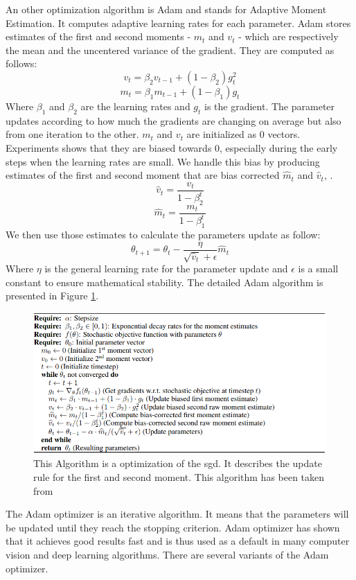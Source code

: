 An other optimization algorithm is Adam and stands for Adaptive Moment Estimation. It computes adaptive learning rates for each parameter. Adam stores estimates of the first and second moments - \(m_t\) and \(v_t\) - which are respectively the mean and the uncentered variance of the gradient. They are computed as follows: \[ v_t = \beta_2 v_{t-1} + (1 - \beta_2)g_t^2 \] \[m_t = \beta_1 m_{t-1} + (1 - \beta_1)g_t \]
Where \(\beta_1\) and \(\beta_2\) are the learning rates and \(g_t\) is the gradient. The parameter updates according to how much the gradients are changing on average but also from one iteration to the other.  \(m_t\) and \(v_t\) are initialized as 0 vectors. Experiments shows that they are biased towards 0, especially during the early steps when the learning rates are small. We handle this bias by producing estimates of the first and second moment that are bias corrected \(\hat{m}_t\) and \(\hat{v}_t\), \cite{adam}.
\[ \hat{v}_t=  \frac{v_{t}}{1 - \beta_2^t}\] 
\[\hat{m}_t=  \frac{m_{t}}{1 - \beta_1^t}\] 
We then use those estimates to calculate the parameters update as follow: \[\theta_{t+1} = \theta_t - \frac{\eta}{\sqrt{\hat{v}_t} + \epsilon}\hat{m}_t\]
Where \(\eta\) is the general learning rate for the parameter update and \(\epsilon\) is a small constant to ensure mathematical stability. 
The detailed  Adam algorithm is presented in Figure \ref{fig:adam_algo}.
\begin{figure}[!htp]
    \centering
        \includegraphics[width=1\textwidth]{figures/02-adam_algo}
        \caption[Adam Algorithm]{ This Algorithm is a optimization of the \gls{sgd}. It describes the update rule for the first and second moment. This algorithm has been taken from \cite{adam}}\label{fig:adam_algo}
\end{figure}
The Adam optimizer is an iterative algorithm. It means that the parameters will be updated until they reach the stopping criterion. 
Adam optimizer has shown that it achieves good results fast and is thus used as a default in many 
computer vision and deep learning algorithms. There are several variants of the Adam optimizer.

